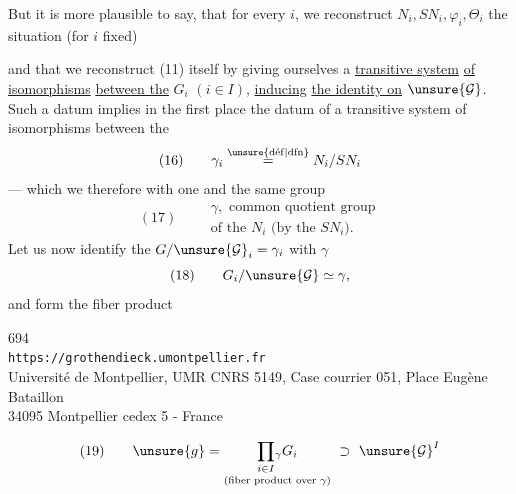 

But it is more plausible to say, that for every $i$, we reconstruct  $N_i,SN_i,\varphi_i,\Theta_i$ the situation (for $i$ fixed)

\noindent {}\quad
{}

and that we reconstruct (11) itself by giving ourselves a \uline{transitive system} \uline{of isomorphisms} \uline{between the} $G_i$ $(i\in I)$, \uline{inducing} \uline{the identity on} $\unsure{\mathcal G}$. Such a datum implies in the first place the datum of a transitive system of isomorphisms between the
\[
(16)\qquad 
\gamma_i\overset{\unsure{\mathrm{d\acute ef}|\mathrm{dfn}}}{=}N_i/SN_i
\]
--- which we  therefore with one and the same group
\[
(17)\qquad 
\begin{gathered}
\gamma,\text{ common quotient group}\\
\text{of the }N_i\text{ (by the }SN_i\text{).}
\end{gathered}
\]
Let us now identify the $G/\unsure{\mathcal G}_i=\gamma_i$ with $\gamma$
\[
(18)\qquad G_i/\unsure{\mathcal G}\simeq\gamma,
\]
and form the fiber product


\begin{center}
694\\
\texttt{https://grothendieck.umontpellier.fr}\\
Université de Montpellier, UMR CNRS 5149, Case courrier 051, Place Eugène Bataillon\\
34095 Montpellier cedex 5 - France
\end{center}



\[
(19)\qquad 
\unsure{g}=\underset{\text{(fiber product over }\gamma\text{)}}{\prod_{i\in I}\!{}_{\gamma}G_i}\ \supset\ \unsure{\mathcal G}^I
\]

